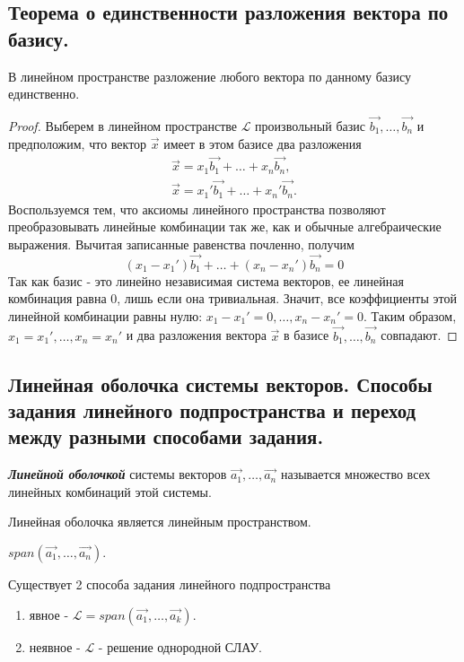 \newpage


\subsection{
    Теорема о единственности разложения вектора по базису.
}

\begin{theorem}
    В линейном пространстве разложение любого вектора по данному базису единственно.
    \label{thm:theorem_2_3}
\end{theorem}

\begin{proof}
    Выберем в линейном пространстве $\mathcal{L}$ произвольный базис $\vec{b_1}, \ldots, \vec{b_n}$ и предположим, что вектор $\vec{x}$ имеет в этом базисе два разложения
    \begin{align*}
        \vec{x} = x_1\vec{b_1} + \ldots + x_n\vec{b_n},\\
        \vec{x} = x_1'\vec{b_1} + \ldots + x_n'\vec{b_n}.
    \end{align*}
    Воспользуемся тем, что аксиомы линейного пространства позволяют преобразовывать линейные комбинации так же, как и обычные алгебраические выражения. Вычитая записанные равенства почленно, получим
    $$(x_1 - x_1')\vec{b_1} + \ldots + (x_n - x_n')\vec{b_n} = 0$$
    Так как базис - это линейно независимая система векторов, ее линейная комбинация равна $0$, лишь если она тривиальная. Значит, все коэффициенты этой линейной комбинации равны нулю: $x_1 - x_1' = 0, \ldots, x_n - x_n' = 0$. Таким образом, $x_1 = x_1', \ldots, x_n = x_n'$ и два разложения вектора $\vec{x}$ в базисе $\vec{b_1}, \ldots, \vec{b_n}$ совпадают.
\end{proof}


\newpage


\subsection{
    Линейная оболочка системы векторов. Способы задания линейного подпространства и переход между разными способами задания.
}

\begin{definition}
    \textbf{\textit{Линейной оболочкой}} системы векторов $\vec{a_1}, \ldots, \vec{a_n}$ называется множество всех линейных комбинаций этой системы.
\end{definition}

\begin{theorem}
    Линейная оболочка является линейным пространством.
\end{theorem}

\begin{designation}
    $span(\vec{a_1}, \ldots, \vec{a_n})$.
\end{designation}

Существует 2 способа задания линейного подпространства

\begin{enumerate}
    \item явное - $\mathcal{L} = span(\vec{a_1}, \ldots, \vec{a_k})$.
    \item неявное - $\mathcal{L}$ - решение однородной СЛАУ.
\end{enumerate}
